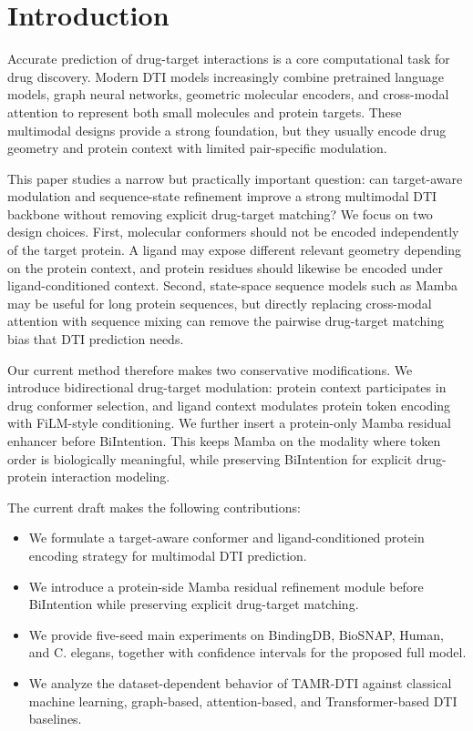 \section{Introduction}

Accurate prediction of drug-target interactions is a core computational task for drug discovery. Modern DTI models increasingly combine pretrained language models, graph neural networks, geometric molecular encoders, and cross-modal attention to represent both small molecules and protein targets. These multimodal designs provide a strong foundation, but they usually encode drug geometry and protein context with limited pair-specific modulation.

This paper studies a narrow but practically important question: can target-aware modulation and sequence-state refinement improve a strong multimodal DTI backbone without removing explicit drug-target matching? We focus on two design choices. First, molecular conformers should not be encoded independently of the target protein. A ligand may expose different relevant geometry depending on the protein context, and protein residues should likewise be encoded under ligand-conditioned context. Second, state-space sequence models such as Mamba \citep{gu2023mamba} may be useful for long protein sequences, but directly replacing cross-modal attention with sequence mixing can remove the pairwise drug-target matching bias that DTI prediction needs.

Our current method therefore makes two conservative modifications. We introduce bidirectional drug-target modulation: protein context participates in drug conformer selection, and ligand context modulates protein token encoding with FiLM-style conditioning. We further insert a protein-only Mamba residual enhancer before BiIntention. This keeps Mamba on the modality where token order is biologically meaningful, while preserving BiIntention for explicit drug-protein interaction modeling.

The current draft makes the following contributions:
\begin{itemize}
  \item We formulate a target-aware conformer and ligand-conditioned protein encoding strategy for multimodal DTI prediction.
  \item We introduce a protein-side Mamba residual refinement module before BiIntention while preserving explicit drug-target matching.
  \item We provide five-seed main experiments on BindingDB, BioSNAP, Human, and C. elegans, together with confidence intervals for the proposed full model.
  \item We analyze the dataset-dependent behavior of TAMR-DTI against classical machine learning, graph-based, attention-based, and Transformer-based DTI baselines.
\end{itemize}
